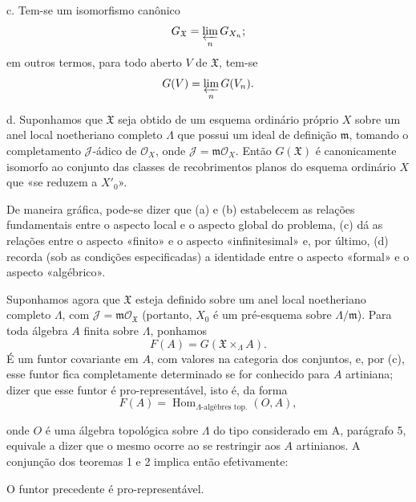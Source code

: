 \noindent c. Tem-se um isomorfismo canônico
\[
  G_{\mathfrak X}=\varprojlim_nG_{X_n} ;
\]
em outros termos, para todo aberto $V$ de $\mathfrak X$, tem-se
\[
  G(V)=\varprojlim_nG(V_n).
\]

\noindent d. Suponhamos que $\mathfrak X$ seja obtido de um esquema ordinário
próprio $X$ sobre um anel local noetheriano completo $\Lambda$ que possui um
ideal de definição $\mathfrak m$, tomando o completamento $\mathcal J$-ádico de
$\mathcal O_X$, onde $\mathcal J=\mathfrak m\mathcal O_X$. Então
$G(\mathfrak X)$ é canonicamente isomorfo ao conjunto das classes de
recobrimentos planos do esquema ordinário $X$ que «se reduzem a $X'_0$».

De maneira gráfica, pode-se dizer que (a) e (b) estabelecem as relações
fundamentais entre o aspecto local e o aspecto global do problema, (c) dá
as relações entre o aspecto «finito» e o aspecto «infinitesimal» e, por
último, (d) recorda (sob as condições especificadas) a identidade entre o
aspecto «formal» e o aspecto «algébrico».

Suponhamos agora que $\mathfrak X$ esteja definido sobre um anel local
noetheriano completo $\Lambda$, com
$\mathcal J=\mathfrak m\mathcal O_{\mathfrak X}$ (portanto, $X_0$ é um
pré-esquema sobre $\Lambda/\mathfrak m$). Para toda álgebra $A$ finita sobre
$\Lambda$, ponhamos
\[
  F(A)=G(\mathfrak X\times_\Lambda A).
\]
É um funtor covariante em $A$, com valores na categoria dos conjuntos,
e, por (c), esse funtor fica completamente determinado se for conhecido para $A$
artiniana; dizer que esse funtor é pro-representável, isto é, da forma
\[
  F(A)=\operatorname{Hom}_{\Lambda\text{-algèbres top.}}(O,A),
\]

onde $O$ é uma álgebra topológica sobre $\Lambda$ do tipo considerado em A,
parágrafo 5, equivale a dizer que o mesmo ocorre ao se restringir aos $A$
artinianos. A conjunção dos teoremas 1 e 2 implica então efetivamente:

 O funtor precedente é pro-representável.

